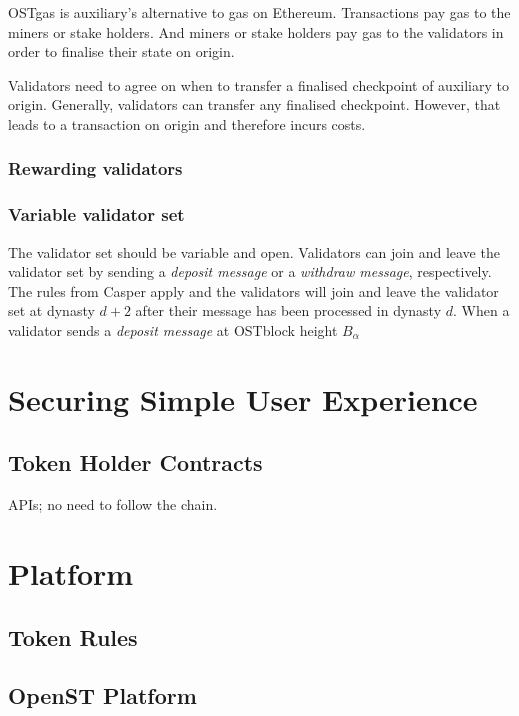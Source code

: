 \documentclass[12pt,a4paper,draft]{article}
\begin{document}
OSTgas is auxiliary's alternative to gas on Ethereum.
Transactions pay gas to the miners or stake holders.
And miners or stake holders pay gas to the validators in order to finalise their state on origin.

Validators need to agree on when to transfer a finalised checkpoint of auxiliary to origin.
Generally, validators can transfer any finalised checkpoint.
However, that leads to a transaction on origin and therefore incurs costs.

\subsubsection{Rewarding validators}

\subsubsection{Variable validator set}

The validator set should be variable and open.
Validators can join and leave the validator set by sending a \emph{deposit message} or a \emph{withdraw message}, respectively.
The rules from Casper apply and the validators will join and leave the validator set at dynasty $d+2$ after their message has been processed in dynasty $d$.
When a validator sends a \emph{deposit message} at OSTblock height $B_\alpha$

\section{Securing Simple User Experience}

\subsection{Token Holder Contracts}

APIs; no need to follow the chain.

\section{Platform}

\subsection{Token Rules}

\subsection{OpenST Platform}
\end{document}
